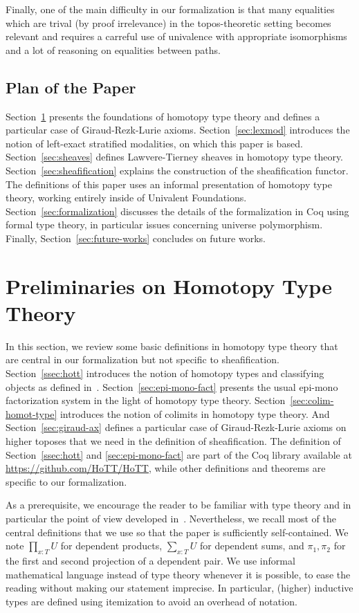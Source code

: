 \documentclass[conference]{IEEEtran}
\begin{document}
Finally, one of the main difficulty in our formalization is that many
equalities which are trival (by proof irrelevance) in the topos-theoretic
setting becomes relevant and requires a carreful use of univalence
with appropriate isomorphisms and a lot of reasoning on equalities
between paths.

\subsection{Plan of the Paper}

Section~\ref{sec:hott} presents the foundations of homotopy type theory
and defines a particular case of Giraud-Rezk-Lurie axioms. 
%
Section~\ref{sec:lexmod} introduces the notion of left-exact stratified
modalities, on which this paper is based.
%
Section~\ref{sec:sheaves} defines Lawvere-Tierney sheaves in homotopy
type theory.
%
Section~\ref{sec:sheafification} explains the construction of the
sheafification functor.
%
The definitions of this paper uses an informal presentation of
homotopy type theory, working entirely inside of Univalent
Foundations. 
Section~\ref{sec:formalization} discusses the details of the
formalization in Coq using formal type theory, in particular issues
concerning universe polymorphism.
%
Finally, Section~\ref{sec:future-works} concludes on future works.


\section{Preliminaries on Homotopy Type Theory}
\label{sec:hott}

In this section, we review some basic definitions in homotopy type
theory that are central in our formalization but not specific to
sheafification. 
%
Section~\ref{ssec:hott} introduces the notion of homotopy types and
classifying objects as defined in~\cite{sets_in_hott}.
%
Section~\ref{sec:epi-mono-fact} presents the usual epi-mono
factorization system in the light of homotopy type theory.
%
Section~\ref{sec:colim-homot-type} introduces the notion of colimits
in homotopy type theory. 
%
And Section~\ref{sec:giraud-ax} defines a particular case of
Giraud-Rezk-Lurie axioms on higher toposes that we need in the
definition of sheafification.
%
The definition of Section~\ref{ssec:hott} and \ref{sec:epi-mono-fact}
are part of the Coq library
available at \url{https://github.com/HoTT/HoTT}, while other definitions
and theorems are specific to our formalization. 

As a prerequisite, we encourage the reader to be familiar with type theory and
in particular the point of view developed
in~\cite{hottbook}. Nevertheless, we recall most of the central definitions 
that we use so that the paper is sufficiently self-contained.
%
We note $\prod_{x:T} U$ for dependent products, $\sum_{x:T} U$ for
dependent sums, and $\pi_1, \pi_2$ for the first and second
projection of a dependent pair. We use informal mathematical language
instead of type theory whenever it is possible, to ease the
reading without making our statement imprecise. In particular,
(higher) inductive types are defined using itemization to avoid an
overhead of notation.
 
\end{document}
